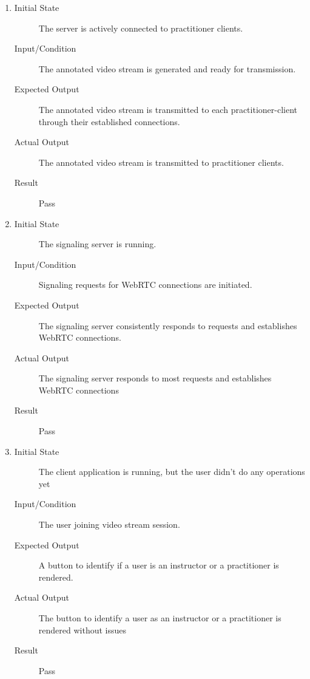 \documentclass[12pt, titlepage]{article}
\begin{document}
\begin{enumerate}[FR-T1]
  \item \label{FRT10}
    \begin{description}
    \item[Initial State] The server is actively connected to practitioner clients.
    \item[Input/Condition] The annotated video stream is generated and ready for
      transmission.
    \item[Expected Output] The annotated video stream is transmitted to each
      practitioner-client through their established connections.
    \item[Actual Output] The annotated video stream is transmitted to practitioner
      clients.
    \item[Result] Pass
    \end{description}
  \item \label{FRT11}
    \begin{description}
    \item[Initial State] The signaling server is running.
    \item[Input/Condition] Signaling requests for WebRTC connections are initiated.
    \item[Expected Output] The signaling server consistently responds to requests
      and establishes WebRTC connections.
    \item[Actual Output] The signaling server responds to most requests and
      establishes WebRTC connections
    \item[Result] Pass
    \end{description}
  \item \label{FRT12}
    \begin{description}
    \item[Initial State] The client application is running, but the user didn’t do
      any operations yet
    \item[Input/Condition] The user joining video stream session.
    \item[Expected Output] A button to identify if a user is an instructor or a
      practitioner is rendered.
    \item[Actual Output] The button to identify a user as an instructor or a
      practitioner is rendered without issues
    \item[Result] Pass
    \end{description}
  \end{enumerate}
\end{document}
